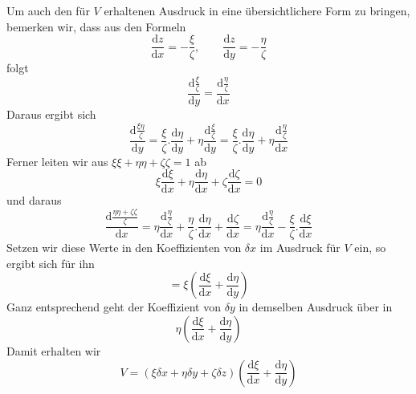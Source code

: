 Um auch den für $V$ erhaltenen Ausdruck in eine übersichtlichere Form zu bringen, bemerken wir, dass aus den Formeln
\[
\frac{\mathrm{d}z}{\mathrm{d}x}=-\frac{\xi}{\zeta},\qquad \frac{\mathrm{d}z}{\mathrm{d}y}=-\frac{\eta}{\zeta}
\]
folgt
\[
\frac{\mathrm{d}\frac{\xi}{\zeta}}{\mathrm{d}y}=\frac{\mathrm{d}\frac{\eta}{\zeta}}{\mathrm{d}x}
\]
Daraus ergibt sich
\[
\frac{\mathrm{d}\frac{\xi\eta}{\zeta}}{\mathrm{d}y}=\frac{\xi}{\zeta}.\frac{\mathrm{d}\eta}{\mathrm{d}y}+\eta\frac{\mathrm{d}\frac{\xi}{\zeta}}{\mathrm{d}y}=\frac{\xi}{\zeta}.\frac{\mathrm{d}\eta}{\mathrm{d}y}+\eta\frac{\mathrm{d}\frac{\eta}{\zeta}}{\mathrm{d}x}
\]
Ferner leiten wir aus $\xi\xi+\eta\eta+\zeta\zeta=1$ ab
\[
\xi\frac{\mathrm{d}\xi}{\mathrm{d}x}+\eta\frac{\mathrm{d}\eta}{\mathrm{d}x}+\zeta\frac{\mathrm{d}\zeta}{\mathrm{d}x}=0
\]
und daraus
\[
\frac{\mathrm{d}\frac{\eta\eta+\zeta\zeta}{\zeta}}{\mathrm{d}x}=\eta\frac{\mathrm{d}\frac{\eta}{\zeta}}{\mathrm{d}x}+\frac{\eta}{\zeta}.\frac{\mathrm{d}\eta}{\mathrm{d}x}+\frac{\mathrm{d}\zeta}{\mathrm{d}x}=\eta\frac{\mathrm{d}\frac{\eta}{\zeta}}{\mathrm{d}x}-\frac{\xi}{\zeta}.\frac{\mathrm{d}\xi}{\mathrm{d}x}
\]
Setzen wir diese Werte in den Koeffizienten von $\delta x$ im Ausdruck für $V$ ein, so ergibt sich für ihn
\[
=\xi(\frac{\mathrm{d}\xi}{\mathrm{d}x}+\frac{\mathrm{d}\eta}{\mathrm{d}y})
\]
Ganz entsprechend geht der Koeffizient von $\delta y$ in demselben Ausdruck über in
\[
\eta(\frac{\mathrm{d}\xi}{\mathrm{d}x}+\frac{\mathrm{d}\eta}{\mathrm{d}y})
\]
Damit erhalten wir
\[
V=(\xi\delta x+\eta\delta y+\zeta\delta z)(\frac{\mathrm{d}\xi}{\mathrm{d}x}+\frac{\mathrm{d}\eta}{\mathrm{d}y})
\]

